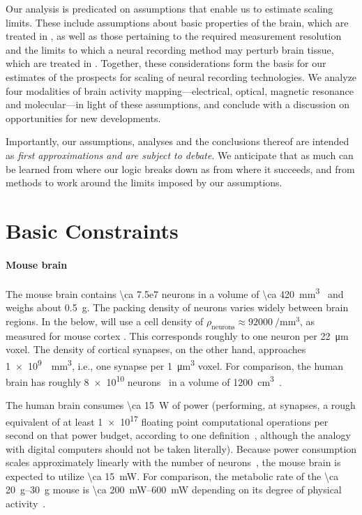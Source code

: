 Our analysis is predicated on assumptions that enable us to estimate scaling limits.
These include assumptions about basic properties of the brain, which are treated in , as well as those pertaining to the required measurement resolution and the limits to which a neural recording method may perturb brain tissue, which are treated in .
Together, these considerations form the basis for our estimates of the prospects for scaling of neural recording technologies.
We analyze four modalities of brain activity mapping---electrical, optical, magnetic resonance and molecular---in light of these assumptions, and conclude with a discussion on opportunities for new developments.

Importantly, our assumptions, analyses and the conclusions thereof are intended as \emph{first approximations and are subject to debate}.
We anticipate that as much can be learned from where our logic breaks down as from where it succeeds, and from methods to work around the limits imposed by our assumptions.

\section{Basic Constraints}
\label{sec:constraints}

\paragraph{Mouse brain}
The mouse brain contains \num{\ca 7.5e7} neurons in a volume of \SI{\ca 420}{\milli\meter\cubed}~\cite{vincent10} and weighs about \SI{0.5}{\gram}.
The packing density of neurons varies widely between brain regions. In the below, will use a cell density of $\rho_{\text{neurons}} \approx \SI{92000}{\per\milli\meter\cubed}$, as measured for mouse cortex \cite{braitenberg1991anatomy}. This corresponds roughly to one neuron per \SI{22}{\micro\meter} voxel. The density of cortical synapses, on the other hand, approaches \SI{1e9}{\per\milli\meter\cubed}, i.e., one synapse per \SI{1}{\micro\meter\cubed} voxel. For comparison, the human brain has roughly \num{8e10} neurons~\cite{azevedo09} in a volume of \SI{1200}{\centi\meter\cubed}~\cite{allen02}.

The human brain consumes \SI{\ca 15}{\watt} of power (performing, at synapses, a rough equivalent of at least \num{1e17} floating point computational operations per second on that power budget, according to one definition~\cite{sarpeshkar10}, although the analogy with digital computers should not be taken literally).
Because power consumption scales approximately linearly with the number of neurons~\cite{houzel11}, the mouse brain is expected to utilize \SI{\ca 15}{\milli\watt}. For comparison, the metabolic rate of the \SIrange{\ca 20}{30}{\gram} mouse is \SIrange{\ca 200}{600}{\milli\watt} depending on its degree of physical activity~\cite{speakman13}.

